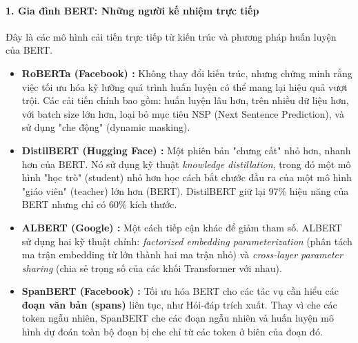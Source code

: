 \paragraph{1. Gia đình BERT: Những người kế nhiệm trực tiếp}
Đây là các mô hình cải tiến trực tiếp từ kiến trúc và phương pháp huấn luyện của BERT.
\begin{itemize}
    \item \textbf{RoBERTa (Facebook) \cite{liu2019roberta}:} Không thay đổi kiến trúc, nhưng chứng minh rằng việc tối ưu hóa kỹ lưỡng quá trình huấn luyện có thể mang lại hiệu quả vượt trội. Các cải tiến chính bao gồm: huấn luyện lâu hơn, trên nhiều dữ liệu hơn, với batch size lớn hơn, loại bỏ mục tiêu NSP (Next Sentence Prediction), và sử dụng "che động" (dynamic masking).
    \item \textbf{DistilBERT (Hugging Face) \cite{sanh2019distilbert}:} Một phiên bản "chưng cất" nhỏ hơn, nhanh hơn của BERT. Nó sử dụng kỹ thuật \textit{knowledge distillation}, trong đó một mô hình "học trò" (student) nhỏ hơn học cách bắt chước đầu ra của một mô hình "giáo viên" (teacher) lớn hơn (BERT). DistilBERT giữ lại 97\% hiệu năng của BERT nhưng chỉ có 60\% kích thước.
    \item \textbf{ALBERT (Google) \cite{lan2019albert}:} Một cách tiếp cận khác để giảm tham số. ALBERT sử dụng hai kỹ thuật chính: \textit{factorized embedding parameterization} (phân tách ma trận embedding từ lớn thành hai ma trận nhỏ) và \textit{cross-layer parameter sharing} (chia sẻ trọng số của các khối Transformer với nhau).
    \item \textbf{SpanBERT (Facebook) \cite{joshi2020spanbert}:} Tối ưu hóa BERT cho các tác vụ cần hiểu các \textbf{đoạn văn bản (spans)} liên tục, như Hỏi-đáp trích xuất. Thay vì che các token ngẫu nhiên, SpanBERT che các đoạn ngẫu nhiên và huấn luyện mô hình dự đoán toàn bộ đoạn bị che chỉ từ các token ở biên của đoạn đó.
\end{itemize}

